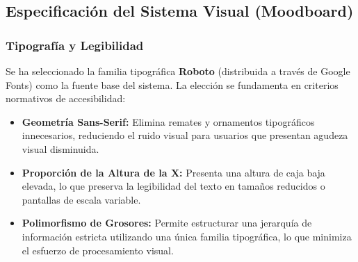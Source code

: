 \subsection{Especificación del Sistema Visual (Moodboard)}
\subsubsection{Tipografía y Legibilidad}
Se ha seleccionado la familia tipográfica \textbf{Roboto} (distribuida a través de Google Fonts) como la fuente base del sistema. La elección se fundamenta en criterios normativos de accesibilidad:
\begin{itemize}
    \item \textbf{Geometría Sans-Serif:} Elimina remates y ornamentos tipográficos innecesarios, reduciendo el ruido visual para usuarios que presentan agudeza visual disminuida.
    \item \textbf{Proporción de la Altura de la X:} Presenta una altura de caja baja elevada, lo que preserva la legibilidad del texto en tamaños reducidos o pantallas de escala variable.
    \item \textbf{Polimorfismo de Grosores:} Permite estructurar una jerarquía de información estricta utilizando una única familia tipográfica, lo que minimiza el esfuerzo de procesamiento visual.
\end{itemize}
